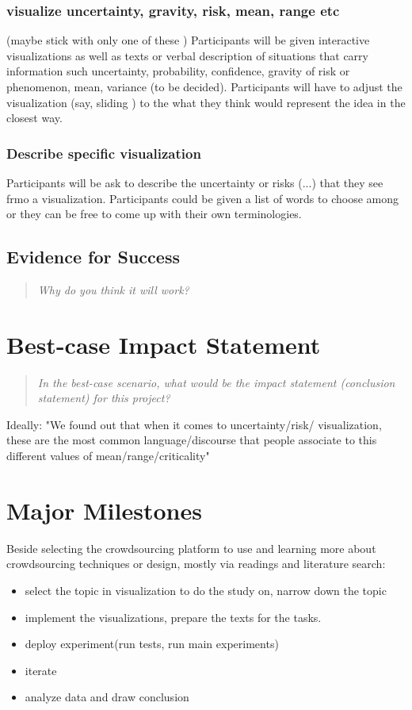 \documentclass{proc}
\begin{document}
\subsubsection*{visualize uncertainty, gravity, risk, mean, range etc}
(maybe stick with only one of these )
Participants will be given interactive visualizations as well as texts or verbal description of situations that carry information such uncertainty, probability, confidence, gravity of risk or phenomenon, mean, variance (to be decided). Participants will have to adjust the visualization (say, sliding ) to the what they think would represent the idea in the closest way. 

\subsubsection*{Describe specific visualization}
Participants will be ask to describe the uncertainty or risks (...) that they see frmo a visualization. Participants could be given a list of words to choose among or they can be free to come up with their own terminologies. 


\subsection{Evidence for Success}
\begin{quote}
\textit{Why do you think it will work?} 

\end{quote}

\section{Best-case Impact Statement}
\begin{quote}
\textit{In the best-case scenario, what would be the impact statement (conclusion statement) for this project?}
\end{quote}
Ideally: "We found out that when it comes to uncertainty/risk/ visualization, these are the most common language/discourse that people associate to this different values of mean/range/criticality"

\section{Major Milestones}
Beside selecting  the crowdsourcing platform to use and learning more about crowdsourcing techniques or design, mostly via readings and literature search: 
\begin{itemize}
	\item select the topic in visualization to do the study on, narrow down the topic
	\item implement the visualizations, prepare the texts for the tasks. 
	\item deploy experiment(run tests, run main experiments)
	\item iterate
	\item analyze data and draw conclusion
\end{itemize}
\end{document}
